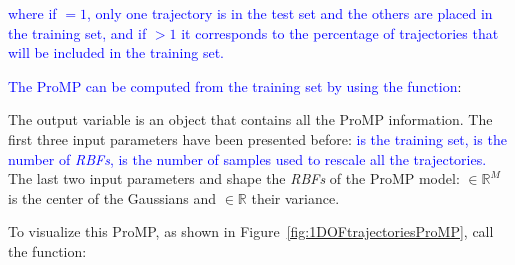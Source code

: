 \documentclass[utf8]{frontiersSCNS} %
\newcommand{\rev}[1]{\textcolor{blue}{#1}}
\newcommand{\todo}[1]{\textcolor{red}{\textbf{/*#1*/}}}
\begin{document}
\rev{where if $=1$, only one trajectory is in the test set and the others are placed in the training set, and if \mcode{partitionType}$ >1$ it corresponds to the percentage of trajectories that will be included in the training set.} 

\rev{The ProMP can be computed from the training set by using the function}:


The output variable  is an object that contains all the ProMP information. 
The first three input parameters have been presented before: \rev{ is the training set,  is the number of \textit{RBFs}, \mcode{s_ref} is the number of samples used to rescale all the trajectories.}
The last two input parameters  and  shape the \textit{RBFs} of the ProMP model:  $\in \mathbb{R}^M$ is the center of the Gaussians and  $\in \mathbb{R}$ their variance. 

To visualize this ProMP, as shown in Figure~\ref{fig:1DOFtrajectoriesProMP}, call the function:
\end{document}

